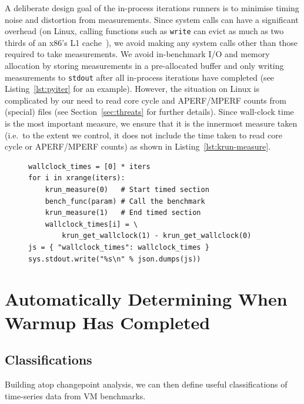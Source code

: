 \documentclass[preprint,numbers,10pt]{sigplanconf}
\begin{document}
A deliberate design goal of the in-process iterations runners is to minimise
timing noise and distortion from measurements. Since system calls can have a
significant overhead (on Linux, calling functions such as \texttt{write} can
evict as much as two thirds of an x86's L1 cache~\cite{soares10flexsc}), we
avoid making any system calls other than those required to take measurements. We
avoid in-benchmark I/O and memory allocation by storing measurements in a
pre-allocated buffer and only writing measurements to \texttt{stdout} after all
in-process iterations have completed (see Listing~\ref{lst:pyiter} for an
example). However, the situation on Linux is complicated by our need to read
core cycle and APERF/MPERF counts from (special) files (see
Section~\ref{sec:threats} for further details). Since wall-clock time
is the most important measure, we ensure that it is the innermost measure taken
(i.e.~to the extent we control, it does not include the time taken to read
core cycle or APERF/MPERF counts) as shown in Listing~\ref{lst:krun-measure}.

\begin{figure}[t]
\begin{lstlisting}[label=lst:pyiter, caption={An elided version of the Python
in-process iterations runner (with core cycles etc. removed).}]
wallclock_times = [0] * iters
for i in xrange(iters):
    krun_measure(0)   # Start timed section
    bench_func(param) # Call the benchmark
    krun_measure(1)   # End timed section
    wallclock_times[i] = \
        krun_get_wallclock(1) - krun_get_wallclock(0)
js = { "wallclock_times": wallclock_times }
sys.stdout.write("%s\n" % json.dumps(js))
\end{lstlisting}
\end{figure}


\section{Automatically Determining When Warmup Has Completed}


\subsection{Classifications}

Building atop changepoint analysis, we can then define useful classifications of
time-series data from VM benchmarks.
\end{document}
